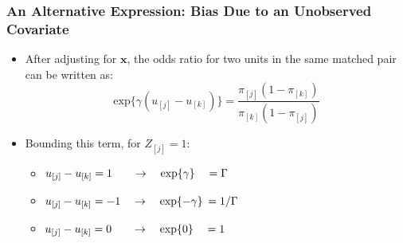 \documentclass{beamer}
\begin{document}
\begin{frame}
  \frametitle{An Alternative Expression: Bias Due to an Unobserved Covariate}
  \begin{itemize}

\item<+-> After adjusting for $\mathbf{x}$, the odds ratio for two units
  in the same matched pair can be written as:
$$\textrm{exp}\{\gamma(u_{[j]}-u_{[k]})\} = \frac{\pi_{[j]}(1-\pi_{[k]})}{\pi_{[k]}(1-\pi_{[j]})}  $$
\item<+-> Bounding this term, for $Z_{[j]}=1$:
\begin{itemize}
\item[] $u_{[j]} - u_{[k]} = 1 \hspace{1.8em} \rightarrow \hspace{1em}
  \textrm{exp}\{\gamma\}
 \hspace{1em}=\Gamma$
\item[] $u_{[j]} - u_{[k]} = -1 \hspace{1em} \rightarrow \hspace{1em}
  \textrm{exp}\{-\gamma\}
 \hspace{.2em}={1}/{\Gamma}$
\item[] $u_{[j]} - u_{[k]} = 0 \hspace{1.8em} \rightarrow \hspace{1em}
  \textrm{exp}\{0\}
 \hspace{1em}=1$
\end{itemize}
  \end{itemize}
\end{frame}
\end{document}
